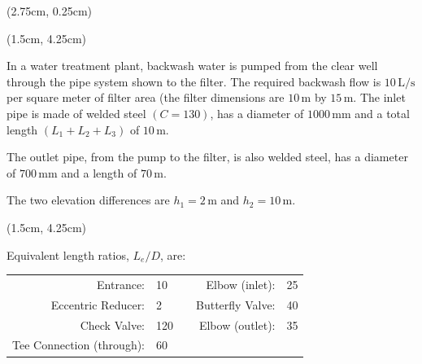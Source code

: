 \documentclass[9pt,xcolor={svgnames, x11names},mathpazo, professionalfonts]{beamer}
\begin{document}
\begin{frame}
	
	\begin{textblock*}{0.75\columnwidth}(2.75cm, 0.25cm)
	\end{textblock*}
	
	\begin{textblock*}{0.95\columnwidth}(1.5cm, 4.25cm)
		\begin{myexam}{}{}
			\raggedright
			In a water treatment plant, backwash water is pumped from the clear well through the pipe system shown to the filter.
			The required backwash flow is $10\,\text{L/s}$ per square meter of filter area (the filter dimensions are
			$10\,\text{m}$ by $15\,\text{m}$.
			The inlet pipe is made of welded steel $(C=130)$, has a diameter of $1000\,\text{mm}$ and a total length
			$\left(L_1+L_2+L_3\right)$ of $10\,\text{m}$.
			\par\medskip
			The outlet pipe, from the pump to the filter, is also welded steel, has a diameter of $700\,\text{mm}$ and a length
			of $70\,\text{m}$.
			\par\medskip
			The two elevation differences are $h_1=2\,\text{m}$ and $h_2=10\,\text{m}$.
		\end{myexam}
	\end{textblock*}
\end{frame}
\begin{frame}{}
	
	
	\begin{textblock*}{0.95\columnwidth}(1.5cm, 4.25cm)
		\begin{mybox}[title=Cont'd\ldots]{}{}
			Equivalent length ratios, $L_e/D$, are:
			\par\smallskip
			\begin{center}
				\begin{tabular}{rlcrl}
					Entrance:          & 10  &   & Elbow (inlet):   & 25 \\
					Eccentric Reducer: & 2   &   & Butterfly Valve: & 40 \\
					Check Valve:       & 120 &   & Elbow (outlet):  & 35 \\
					Tee Connection (through): & 60
				\end{tabular}
			\end{center}
			\par\medskip
		\end{mybox}
	\end{textblock*}
\end{frame}
\end{document}
